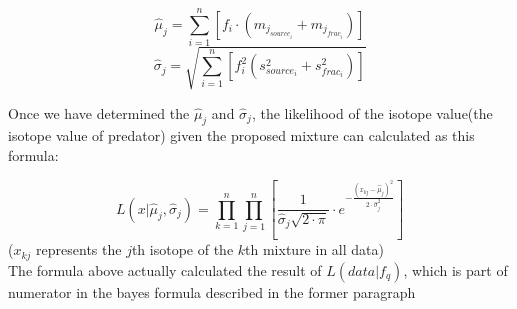\documentclass{article}
\begin{document}
\begin{displaymath}
\hat\mu _{j} = \sum _{i = 1} ^{n}\left[f_{i}\cdot\left(m_{j_{source_{i}}} + m_{j_{frac_{i}}}\right)\right]
\end{displaymath}
\begin{displaymath}
\hat\sigma _{j} = \sqrt{\sum _{i = 1} ^{n}\left[f_{i}^{2}\left(s^{2}_{source_{i}} + s^{2}_{frac_{i}}\right)\right]}
\end{displaymath}
\par Once we have determined the $\hat\mu_{j}$ and $\hat\sigma_{j}$, the likelihood of the isotope value(the isotope value of predator) given the proposed mixture can calculated as this formula:

\begin{displaymath}
L(x | \hat\mu_{j}, \hat\sigma_{j}) = \prod\limits_ {k=1}^{n}\prod\limits_{j=1}^{n}\left[\frac{1}{\hat\sigma_{j}\sqrt{2\cdot\pi}}\cdot e^{-\frac{(x_{kj} - \hat\mu_j)^2}{2\cdot\hat\sigma^2_j}}\right]
\end{displaymath}
($x_{kj}$ represents the $j$th isotope of the $k$th mixture in all data)\\
The formula above actually calculated the result of $L(data|f_{q})$, which is part of numerator in the bayes formula described in the former paragraph
\end{document}
